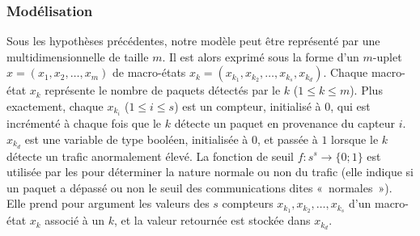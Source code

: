         \subsubsection{Modélisation}
Sous les hypothèses précédentes, notre modèle peut être représenté par une \cmtc multidimensionnelle de taille $m$.
Il est alors exprimé sous la forme d'un $m$-uplet $x\!=\!(x_1,x_2,\dots,x_m)$ de macro-états $x_k\!=\!(x_{k_1},x_{k_2},\dots,x_{k_s},x_{k_d})$.
Chaque macro-état $x_k$ représente le nombre de paquets détectés par le \cn $k$ ($1\leq k\leq m$).
Plus exactement, chaque $x_{k_i}$ ($1\leq i\leq s$) est un compteur, initialisé à $0$, qui est incrémenté à chaque fois que le \cn $k$ détecte un paquet en provenance du capteur $i$.
$x_{k_d}$ est une variable de type booléen, initialisée à $0$, et passée à $1$ lorsque le \cn $k$ détecte un trafic anormalement élevé.
La fonction de seuil $f:s^s\rightarrow\{0;1\}$ est utilisée par les \cns pour déterminer la nature normale ou non du trafic (elle indique si un paquet a dépassé ou non le seuil des communications dites «~normales~»).
Elle prend pour argument les valeurs des $s$ compteurs $x_{k_1},x_{k_2},\dots,x_{k_s}$ d'un macro-état $x_k$ associé à un \cn $k$, et la valeur retournée est stockée dans $x_{k_d}$.

